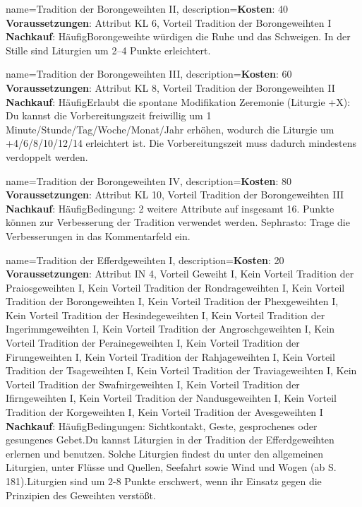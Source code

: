 {
    name={Tradition der Borongeweihten II},
    description={\textbf{Kosten}: 40 \textbf{Voraussetzungen}: Attribut KL 6, Vorteil Tradition der Borongeweihten I \textbf{Nachkauf}: Häufig\newline Borongeweihte würdigen die Ruhe und das Schweigen. In der Stille sind Liturgien um 2–4 Punkte erleichtert.}
}


{
    name={Tradition der Borongeweihten III},
    description={\textbf{Kosten}: 60 \textbf{Voraussetzungen}: Attribut KL 8, Vorteil Tradition der Borongeweihten II \textbf{Nachkauf}: Häufig\newline Erlaubt die spontane Modifikation Zeremonie (Liturgie +X): Du kannst die Vorbereitungszeit freiwillig um 1 Minute/Stunde/Tag/Woche/Monat/Jahr erhöhen, wodurch die Liturgie um +4/6/8/10/12/14 erleichtert ist. Die Vorbereitungszeit muss dadurch mindestens verdoppelt werden.}
}


{
    name={Tradition der Borongeweihten IV},
    description={\textbf{Kosten}: 80 \textbf{Voraussetzungen}: Attribut KL 10, Vorteil Tradition der Borongeweihten III \textbf{Nachkauf}: Häufig\newline Bedingung: 2 weitere Attribute auf insgesamt 16. Punkte können zur Verbesserung der Tradition verwendet werden. Sephrasto: Trage die Verbesserungen in das Kommentarfeld ein.}
}


{
    name={Tradition der Efferdgeweihten I},
    description={\textbf{Kosten}: 20 \textbf{Voraussetzungen}: Attribut IN 4, Vorteil Geweiht I, Kein Vorteil Tradition der Praiosgeweihten I, Kein Vorteil Tradition der Rondrageweihten I, Kein Vorteil Tradition der Borongeweihten I, Kein Vorteil Tradition der Phexgeweihten I, Kein Vorteil Tradition der Hesindegeweihten I, Kein Vorteil Tradition der Ingerimmgeweihten I, Kein Vorteil Tradition der Angroschgeweihten I, Kein Vorteil Tradition der Perainegeweihten I, Kein Vorteil Tradition der Firungeweihten I, Kein Vorteil Tradition der Rahjageweihten I, Kein Vorteil Tradition der Tsageweihten I, Kein Vorteil Tradition der Traviageweihten I, Kein Vorteil Tradition der Swafnirgeweihten I, Kein Vorteil Tradition der Ifirngeweihten I, Kein Vorteil Tradition der Nandusgeweihten I, Kein Vorteil Tradition der Korgeweihten I, Kein Vorteil Tradition der Avesgeweihten I \textbf{Nachkauf}: Häufig\newline Bedingungen: Sichtkontakt, Geste, gesprochenes oder gesungenes Gebet.\newline Du kannst Liturgien in der Tradition der Efferdgeweihten erlernen und benutzen. Solche Liturgien findest du unter den allgemeinen Liturgien, unter Flüsse und Quellen, Seefahrt sowie Wind und Wogen (ab S. 181).\newline Liturgien sind um 2-8 Punkte erschwert, wenn ihr Einsatz gegen die Prinzipien des Geweihten verstößt.}
}



